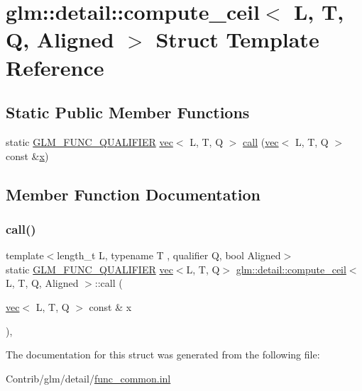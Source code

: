 \hypertarget{structglm_1_1detail_1_1compute__ceil}{}\section{glm\+:\+:detail\+:\+:compute\+\_\+ceil$<$ L, T, Q, Aligned $>$ Struct Template Reference}
\label{structglm_1_1detail_1_1compute__ceil}
\subsection*{Static Public Member Functions}
\begin{DoxyCompactItemize}
\item 
static \mbox{\hyperlink{setup_8hpp_a33fdea6f91c5f834105f7415e2a64407}{G\+L\+M\+\_\+\+F\+U\+N\+C\+\_\+\+Q\+U\+A\+L\+I\+F\+I\+ER}} \mbox{\hyperlink{structglm_1_1vec}{vec}}$<$ L, T, Q $>$ \mbox{\hyperlink{structglm_1_1detail_1_1compute__ceil_aa0594e4c508780f45c9f7956e143e591}{call}} (\mbox{\hyperlink{structglm_1_1vec}{vec}}$<$ L, T, Q $>$ const \&\mbox{\hyperlink{_s_d_l__opengl_8h_ad0e63d0edcdbd3d79554076bf309fd47}{x}})
\end{DoxyCompactItemize}


\subsection{Member Function Documentation}
\mbox{\label{structglm_1_1detail_1_1compute__ceil_aa0594e4c508780f45c9f7956e143e591}} 
\subsubsection{\texorpdfstring{call()}{call()}}
{\footnotesize\ttfamily template$<$length\+\_\+t L, typename T , qualifier Q, bool Aligned$>$ \\
static \mbox{\hyperlink{setup_8hpp_a33fdea6f91c5f834105f7415e2a64407}{G\+L\+M\+\_\+\+F\+U\+N\+C\+\_\+\+Q\+U\+A\+L\+I\+F\+I\+ER}} \mbox{\hyperlink{structglm_1_1vec}{vec}}$<$L, T, Q$>$ \mbox{\hyperlink{structglm_1_1detail_1_1compute__ceil}{glm\+::detail\+::compute\+\_\+ceil}}$<$ L, T, Q, Aligned $>$\+::call (\begin{DoxyParamCaption}\item[{\mbox{\hyperlink{structglm_1_1vec}{vec}}$<$ L, T, Q $>$ const \&}]{x }\end{DoxyParamCaption})\hspace{0.3cm}{\ttfamily [inline]}, {\ttfamily [static]}}



The documentation for this struct was generated from the following file\+:\begin{DoxyCompactItemize}
\item 
Contrib/glm/detail/\mbox{\hyperlink{func__common_8inl}{func\+\_\+common.\+inl}}\end{DoxyCompactItemize}
